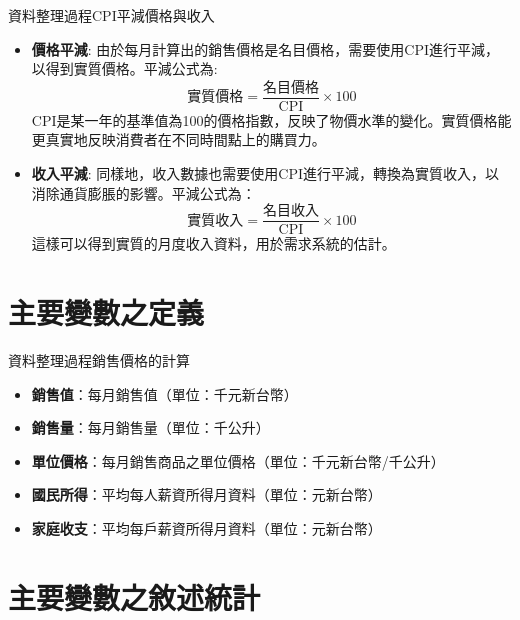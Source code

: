 \documentclass[12pt]{beamer}
\begin{document}
\begin{frame}{資料整理過程}{CPI平減價格與收入}
	\begin{itemize}
		\item \textbf{價格平減}: 由於每月計算出的銷售價格是名目價格，需要使用CPI進行平減，以得到實質價格。平減公式為:
		\[
			\text{實質價格} = \frac{\text{名目價格}}{\textrm{CPI}} \times 100
		\]
		CPI是某一年的基準值為100的價格指數，反映了物價水準的變化。實質價格能更真實地反映消費者在不同時間點上的購買力。  \vspace*{0.3cm}
		\item \textbf{收入平減}: 同樣地，收入數據也需要使用CPI進行平減，轉換為實質收入，以消除通貨膨脹的影響。平減公式為：
		\[
			\text{實質收入} = \frac{\text{名目收入}}{\textrm{CPI}} \times 100
		\]
		這樣可以得到實質的月度收入資料，用於需求系統的估計。
	\end{itemize} \vspace*{0.3cm}
\end{frame}

\section{主要變數之定義}

\begin{frame}{資料整理過程}{銷售價格的計算}
	\begin{itemize}
		\item \textbf{銷售值}：每月銷售值（單位：千元新台幣） \vspace*{0.3cm}
		\item \textbf{銷售量}：每月銷售量（單位：千公升）\vspace*{0.3cm}
		\item \textbf{單位價格}：每月銷售商品之單位價格（單位：千元新台幣/千公升）\vspace*{0.3cm}
		\item \textbf{國民所得}：平均每人薪資所得月資料（單位：元新台幣）\vspace*{0.3cm}
		\item \textbf{家庭收支}：平均每戶薪資所得月資料（單位：元新台幣）
	\end{itemize}
\end{frame}

\section{主要變數之敘述統計}
\end{document}
